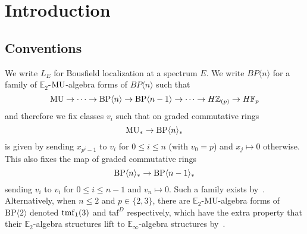 
\section{Introduction}





\subsection{Conventions}
We write $L_{E}$ for Bousfield localization at a spectrum $E$. We write $BP\langle n\rangle$ for a family of $\mathbb{E}_{2}$-$\mathrm{MU}$-algebra forms of $BP\langle n\rangle$ such that 
\[\mathrm{MU} \to  \dots \to \mathrm{BP}\langle n\rangle\to  \mathrm{BP}\langle n-1\rangle\to  \dots  \to H\mathbb{Z}_{(p)}\to H\mathbb{F}_{p}\]
and therefore we fix classes $v_{i}$ such that on graded commutative rings
\[\mathrm{MU}_{*}\to  \mathrm{BP}\langle n\rangle_{*}\]
is given by sending $x_{p^{i}-1}$ to $v_{i}$ for $0\le i\le n$ (with $v_{0}=p$) and $x_{j}\mapsto 0$ otherwise. This also fixes the map of graded commutative rings 
\[  \mathrm{BP}\langle n\rangle_{*}\to  \mathrm{BP}\langle n-1\rangle_{*}\]
sending $v_{i}$ to $v_{i}$ for $0\le i\le n-1$ and $v_{n}\mapsto 0$. Such a family exists by~\cite{HW22}. Alternatively, when $n\le 2$ and $p\in \{2,3\}$, there are $\mathbb{E}_2$-$\mathrm{MU}$-algebra forms of $\mathrm{BP}\langle 2\rangle$ denoted $\mathrm{tmf}_1(3)$ and $\mathrm{taf}^{D}$ respectively, which have the extra property that their $\mathbb{E}_2$-algebra structures lift to $\mathbb{E}_{\infty}$-algebra structures by~\cite{HL10,LN12,LN14,CM15}. 
